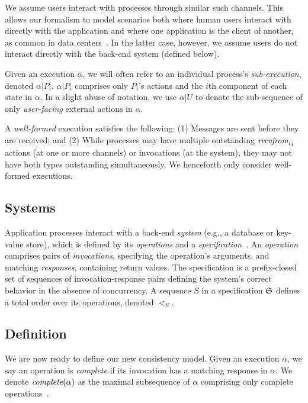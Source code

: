 We assume users interact with processes through similar such channels. This
allows our formalism to model scenarios both where human users interact with
directly with the application and where one application is the client
of another, as common in data centers~\cite{veeraraghavan2016kraken,schwarzkopf2018operating}.
In the latter case, however, we assume users do not interact directly with the back-end system (defined below).

Given an execution $\alpha$, we will often refer to an individual process's
\textit{sub-execution}, denoted $\alpha|P_i$. $\alpha|P_i$ comprises
only $P_i$'s actions and the $i$th component of each state in $\alpha$.
In a slight abuse of notation, we use $\alpha|U$ to denote the sub-sequence
of only \textit{user-facing} external actions in $\alpha$. 

 A \textit{well-formed} execution
satisfies the following: (1) Messages are sent before they are received; and
(2) While processes may have multiple outstanding $\operatorname*{\textit{recvfrom}}_{ij}$ actions
(at one or more channels) or invocations (at the system), they may not have
both types outstanding simultaneously. We henceforth only consider well-formed
executions.

\subsection{Systems}
\label{sec:mdl:systems}

Application processes interact with a back-end \textit{system} (e.g., a database or key-value store),
which is defined by its \textit{operations} and a
\textit{specification}~\cite{herlihy1990linearizability,lynch1996da}. An
\textit{operation} comprises pairs of \textit{invocations}, specifying the
operation's arguments, and matching \textit{responses}, containing
return values. The specification is a prefix-closed set of sequences of
invocation-response pairs defining the system's correct behavior in the absence
of concurrency. A sequence $S$ in a specification $\mathfrak{S}$ defines a total order
over its operations, denoted $<_S$.

\subsection{Definition}
\label{sec:mdl:def}

We are now ready to define our new consistency model.
Given an execution $\alpha$, we say an
operation is \textit{complete} if its invocation has a matching response in
$\alpha$. We denote $\operatorname*{\textit{complete}}(\alpha)$ as the maximal subsequence of $\alpha$
comprising only complete operations~\cite{herlihy1990linearizability}.

